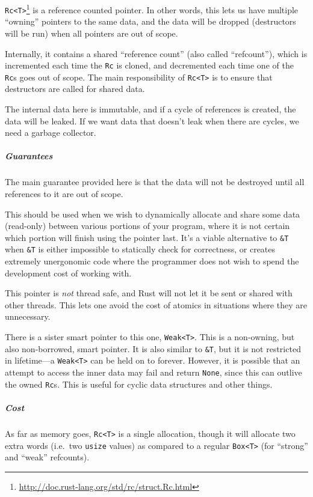 \documentclass[a4paper,]{book}
\renewcommand{\href}[2]{#2\footnote{\url{#1}}}
\let\oldsubparagraph\subparagraph
\renewcommand{\subparagraph}[1]{\oldsubparagraph{#1}\mbox{}}
\begin{document}
\href{http://doc.rust-lang.org/std/rc/struct.Rc.html}{\texttt{Rc\textless{}T\textgreater{}}}
is a reference counted pointer. In other words, this lets us have
multiple ``owning'' pointers to the same data, and the data will be
dropped (destructors will be run) when all pointers are out of scope.

Internally, it contains a shared ``reference count'' (also called
``refcount''), which is incremented each time the \texttt{Rc} is cloned,
and decremented each time one of the \texttt{Rc}s goes out of scope. The
main responsibility of \texttt{Rc\textless{}T\textgreater{}} is to
ensure that destructors are called for shared data.

The internal data here is immutable, and if a cycle of references is
created, the data will be leaked. If we want data that doesn't leak when
there are cycles, we need a garbage collector.

\subparagraph{Guarantees}\label{guarantees}

The main guarantee provided here is that the data will not be destroyed
until all references to it are out of scope.

This should be used when we wish to dynamically allocate and share some
data (read-only) between various portions of your program, where it is
not certain which portion will finish using the pointer last. It's a
viable alternative to \texttt{\&T} when \texttt{\&T} is either
impossible to statically check for correctness, or creates extremely
unergonomic code where the programmer does not wish to spend the
development cost of working with.

This pointer is \emph{not} thread safe, and Rust will not let it be sent
or shared with other threads. This lets one avoid the cost of atomics in
situations where they are unnecessary.

There is a sister smart pointer to this one,
\texttt{Weak\textless{}T\textgreater{}}. This is a non-owning, but also
non-borrowed, smart pointer. It is also similar to \texttt{\&T}, but it
is not restricted in lifetime---a
\texttt{Weak\textless{}T\textgreater{}} can be held on to forever.
However, it is possible that an attempt to access the inner data may
fail and return \texttt{None}, since this can outlive the owned
\texttt{Rc}s. This is useful for cyclic data structures and other
things.

\subparagraph{Cost}\label{cost}

As far as memory goes, \texttt{Rc\textless{}T\textgreater{}} is a single
allocation, though it will allocate two extra words (i.e.~two
\texttt{usize} values) as compared to a regular
\texttt{Box\textless{}T\textgreater{}} (for ``strong'' and ``weak''
refcounts).
\end{document}
